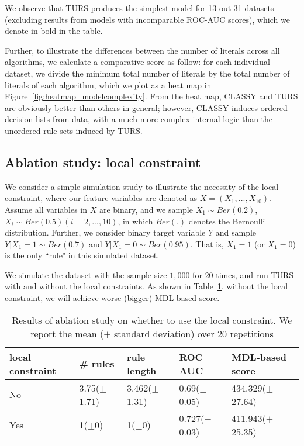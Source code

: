 We observe that TURS produces the simplest model for 13 out 31 datasets (excluding results from models with incomparable ROC-AUC scores), which we denote in bold in the table. 

Further, to illustrate the differences between the number of literals across all algorithms, we calculate a comparative score as follow: for each individual dataset, we divide the minimum total number of literals by the total number of literals of each algorithm, which we plot as a heat map in Figure~\ref{fig:heatmap_modelcomplexity}. From the heat map, CLASSY and TURS are obviously better than others in general; however, CLASSY induces ordered decision lists from data, with a much more complex internal logic than the unordered rule sets induced by TURS. 


\subsection{Ablation study: local constraint}
We consider a simple simulation study to illustrate the necessity of the local constraint, where our feature variables are denoted as $X = (X_1, ..., X_{10})$. Assume all variables in $X$ are binary, and we sample $X_1 \sim Ber(0.2)$, $X_i \sim Ber(0.5) (i = 2, ..., 10)$, in which $Ber(.)$ denotes the Bernoulli distribution. Further, we consider binary target variable $Y$ and sample $Y|X_1 = 1 \sim Ber(0.7)$ and $Y|X_1 = 0 \sim Ber(0.95)$. That is, $X_1 = 1$ (or $X_1 = 0$) is the only ``rule" in this simulated dataset. 

We simulate the dataset with the sample size $1,000$ for $20$ times, and run TURS with and without the local constraints. As shown in Table~\ref{table:ablation_simu}, without the local constraint, we will achieve worse (bigger) MDL-based score. 

\begin{table}[ht]
\centering
\begin{tabular}{lllll}
  \hline
local constraint & \# rules & rule length & ROC AUC & MDL-based score \\ 
  \hline
No & 3.75($\pm$1.71) & 3.462($\pm$1.31) & 0.69($\pm$0.05) & 434.329($\pm$27.64) \\ 
  Yes & 1($\pm$0) & 1($\pm$0) & 0.727($\pm$0.03) & 411.943($\pm$25.35) \\ 
   \hline
\end{tabular}
\caption{Results of ablation study on whether to use the local constraint. We report the mean ($\pm$ standard deviation) over $20$ repetitions } \label{table:ablation_simu}
\end{table}

